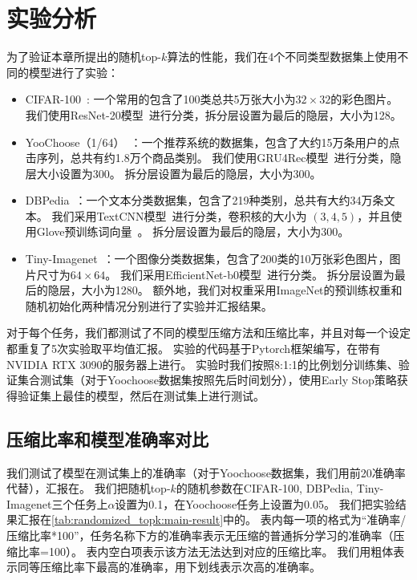 \section{实验分析}

为了验证本章所提出的随机top-$k$算法的性能，我们在4个不同类型数据集上使用不同的模型进行了实验：
\begin{itemize}
    \item CIFAR-100~\cite{krizhevsky_2009_cifar}: 一个常用的包含了100类总共5万张大小为$32\times 32$的彩色图片。
        我们使用ResNet-20模型~\cite{hekaiming2016resnet}进行分类，拆分层设置为最后的隐层，大小为128。
    \item YooChoose（1/64）~\cite{ben2015yoochoose}：一个推荐系统的数据集，包含了大约15万条用户的点击序列，总共有约1.8万个商品类别。
        我们使用GRU4Rec模型~\cite{jannach2017gru4rec}进行分类，隐层大小设置为300。
        拆分层设置为最后的隐层，大小为300。
    \item DBPedia~\cite{2007dbpedia}：一个文本分类数据集，包含了219种类别，总共有大约34万条文本。
        我们采用TextCNN模型~\cite{kimyoon2014textcnn}进行分类，卷积核的大小为 $(3,4,5)$，并且使用Glove预训练词向量~\cite{pennington2014glove}。
        拆分层设置为最后的隐层，大小为300。
    \item Tiny-Imagenet~\cite{tiny-imagenet}：一个图像分类数据集，包含了200类的10万张彩色图片，图片尺寸为$64\times 64$。
        我们采用EfficientNet-b0模型~\cite{tanmingxing2019efficientnet}进行分类。
        拆分层设置为最后的隐层，大小为1280。
        额外地，我们对权重采用ImageNet的预训练权重和随机初始化两种情况分别进行了实验并汇报结果。
\end{itemize}
%
对于每个任务，我们都测试了不同的模型压缩方法和压缩比率，并且对每一个设定都重复了5次实验取平均值汇报。
%
实验的代码基于Pytorch框架编写，在带有NVIDIA RTX 3090的服务器上进行。
%
实验时我们按照8:1:1的比例划分训练集、验证集合测试集（对于Yoochoose数据集按照先后时间划分），使用Early Stop策略获得验证集上最佳的模型，然后在测试集上进行测试。

\subsection{压缩比率和模型准确率对比}
%
我们测试了模型在测试集上的准确率（对于Yoochoose数据集，我们用前20准确率代替），汇报在。
%
我们把随机top-$k$的随机参数在CIFAR-100, DBPedia, Tiny-Imagenet三个任务上$\alpha$设置为0.1，在Yoochoose任务上设置为0.05。
%
我们把实验结果汇报在\autoref{tab:randomized_topk:main-result}中的。
表内每一项的格式为“准确率/压缩比率*100”，任务名称下方的准确率表示无压缩的普通拆分学习的准确率（压缩比率=100）。
表内空白项表示该方法无法达到对应的压缩比率。
我们用粗体表示同等压缩比率下最高的准确率，用下划线表示次高的准确率。


